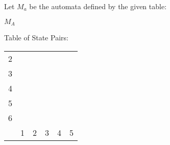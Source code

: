 Let $M_a$ be the automata defined by the given table:
\begin{automata}{$M_A$}
	
	
	
	
	
	
	
	
\end{automata}

Table of State Pairs: \\
\begin{center} \begin{tabular}{*{6}{c|}}
									\cline{1-2}
	2 &  						\\	\cline{1-3}
	3 &   &  					\\	\cline{1-4}
	4 &   &   &  				\\	\cline{1-5}
	5 &   &   &   &  			\\	\cline{1-6}
	6 &   &   &   &   &  		\\	\hline
	  & 1 & 2 & 3 & 4 & 5		\\
\end{tabular} \end{center}
